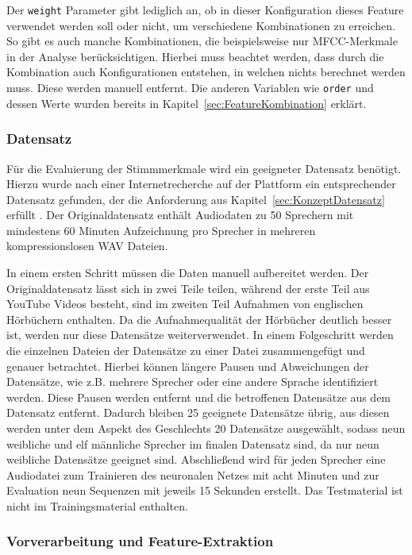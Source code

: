 Der \texttt{weight} Parameter gibt lediglich an, ob in dieser Konfiguration dieses Feature verwendet werden soll oder nicht, um verschiedene Kombinationen zu erreichen.
So gibt es auch manche Kombinationen, die beispielsweise nur \ac{MFCC}-Merkmale in der Analyse berücksichtigen.
Hierbei muss beachtet werden, dass durch die Kombination auch Konfigurationen entstehen, in welchen nichts berechnet werden muss.
Diese werden manuell entfernt.
Die anderen Variablen wie \texttt{order} und dessen Werte wurden bereits in Kapitel~\ref{sec:FeatureKombination} erklärt.

\subsubsection{Datensatz}

\textauthor{\vLB}{}{}

Für die Evaluierung der Stimmmerkmale wird ein geeigneter Datensatz benötigt.
Hierzu wurde nach einer Internetrecherche auf der Plattform  ein entsprechender Datensatz gefunden, der die Anforderung aus Kapitel~\ref{sec:KonzeptDatensatz} erfüllt \autocite[vgl.][]{jain_speaker_2019}. 
Der Originaldatensatz enthält Audiodaten zu 50 Sprechern mit mindestens 60 Minuten Aufzeichnung pro Sprecher in mehreren kompressionslosen WAV Dateien.

In einem ersten Schritt müssen die Daten manuell aufbereitet werden.
Der Originaldatensatz lässt sich in zwei Teile teilen, während der erste Teil aus YouTube Videos besteht, sind im zweiten Teil Aufnahmen von englischen Hörbüchern enthalten.
Da die Aufnahmequalität der Hörbücher deutlich besser ist, werden nur diese Datensätze weiterverwendet.
In einem Folgeschritt werden die einzelnen Dateien der Datensätze zu einer Datei zusammengefügt und genauer betrachtet.
Hierbei können längere Pausen und Abweichungen der Datensätze, wie z.B. mehrere Sprecher oder eine andere Sprache identifiziert werden.
Diese Pausen werden entfernt und die betroffenen Datensätze aus dem Datensatz entfernt.
Dadurch bleiben 25 geeignete Datensätze übrig, aus diesen werden unter dem Aspekt des Geschlechts 20 Datensätze ausgewählt, sodass neun weibliche und elf männliche Sprecher im finalen Datensatz sind, da nur neun weibliche Datensätze geeignet sind.
Abschließend wird für jeden Sprecher eine Audiodatei zum Trainieren des neuronalen Netzes mit acht Minuten und zur Evaluation neun Sequenzen mit jeweils 15 Sekunden erstellt.
Das Testmaterial ist nicht im Trainingsmaterial enthalten.

\subsubsection{Vorverarbeitung und Feature-Extraktion}\label{section:umsetzung-versuch-vorverarbeitung}

